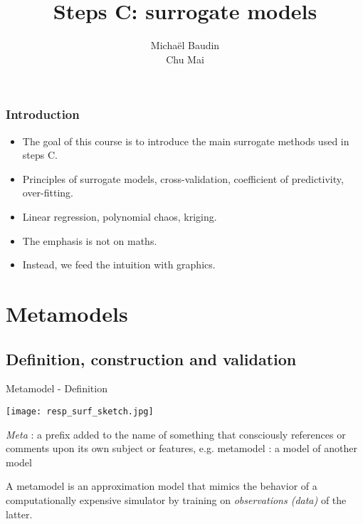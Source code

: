 \documentclass{beamer}
\title{Steps C: surrogate models}
\author[M. Baudin]{Michaël Baudin\\Chu Mai}
\begin{document}
\frame{\titlepage}


\begin{frame}
\frametitle{Introduction}

\begin{itemize}
\item The goal of this course is to introduce the main surrogate methods used in 
steps C. 

\item Principles of surrogate models, cross-validation, coefficient of predictivity, over-fitting.

\item Linear regression, polynomial chaos, kriging.

\item The emphasis is not on maths. 

\item Instead, we feed the intuition with graphics. 
\end{itemize}

\end{frame}


\begin{frame}
\begin{multicols}{2}
  {\tableofcontents[hideallsubsections]}
\end{multicols}
\end{frame}


\section{Metamodels}

\subsection{Definition, construction and validation}

\begin{frame}[t]{Metamodel - Definition}

\begin{center}
 \texttt{[image: resp\_surf\_sketch.jpg]}
\end{center}

\emph{Meta} : a prefix added to the name of something that consciously references or comments upon its own subject or features, e.g. metamodel : a model of another model

\vspace{0.2cm}
A metamodel is an approximation model that mimics the behavior of a computationally expensive simulator by training on \emph{observations (data)} of the latter.

\end{frame}
\end{document}
